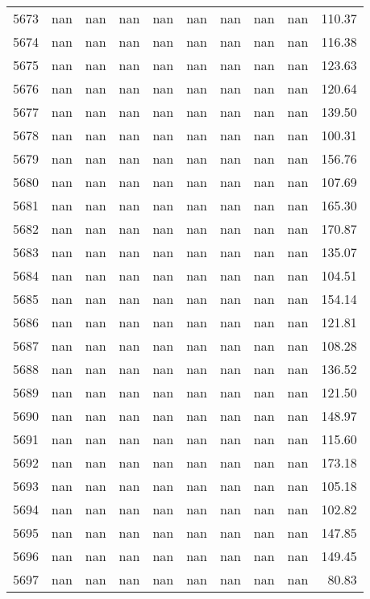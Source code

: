 \begin{tabular}{lrrrrrrrrr}
5673 & nan & nan & nan & nan & nan & nan & nan & nan & 110.37 \\
5674 & nan & nan & nan & nan & nan & nan & nan & nan & 116.38 \\
5675 & nan & nan & nan & nan & nan & nan & nan & nan & 123.63 \\
5676 & nan & nan & nan & nan & nan & nan & nan & nan & 120.64 \\
5677 & nan & nan & nan & nan & nan & nan & nan & nan & 139.50 \\
5678 & nan & nan & nan & nan & nan & nan & nan & nan & 100.31 \\
5679 & nan & nan & nan & nan & nan & nan & nan & nan & 156.76 \\
5680 & nan & nan & nan & nan & nan & nan & nan & nan & 107.69 \\
5681 & nan & nan & nan & nan & nan & nan & nan & nan & 165.30 \\
5682 & nan & nan & nan & nan & nan & nan & nan & nan & 170.87 \\
5683 & nan & nan & nan & nan & nan & nan & nan & nan & 135.07 \\
5684 & nan & nan & nan & nan & nan & nan & nan & nan & 104.51 \\
5685 & nan & nan & nan & nan & nan & nan & nan & nan & 154.14 \\
5686 & nan & nan & nan & nan & nan & nan & nan & nan & 121.81 \\
5687 & nan & nan & nan & nan & nan & nan & nan & nan & 108.28 \\
5688 & nan & nan & nan & nan & nan & nan & nan & nan & 136.52 \\
5689 & nan & nan & nan & nan & nan & nan & nan & nan & 121.50 \\
5690 & nan & nan & nan & nan & nan & nan & nan & nan & 148.97 \\
5691 & nan & nan & nan & nan & nan & nan & nan & nan & 115.60 \\
5692 & nan & nan & nan & nan & nan & nan & nan & nan & 173.18 \\
5693 & nan & nan & nan & nan & nan & nan & nan & nan & 105.18 \\
5694 & nan & nan & nan & nan & nan & nan & nan & nan & 102.82 \\
5695 & nan & nan & nan & nan & nan & nan & nan & nan & 147.85 \\
5696 & nan & nan & nan & nan & nan & nan & nan & nan & 149.45 \\
5697 & nan & nan & nan & nan & nan & nan & nan & nan & 80.83 \\

\end{tabular}
